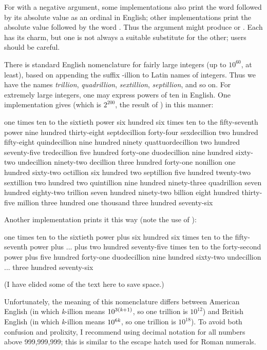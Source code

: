 \begin{flushdesc}
\begin{new}
For  with a negative argument, some implementations also print
the word  followed by its absolute value as an ordinal in English;
other implementations print the absolute value followed by the word .
Thus the argument  might produce  or .
Each has its charm, but one is not always a suitable substitute for the other;
users should be careful.

There is standard English nomenclature for fairly large integers (up to $10^60$,
at least), based on appending the suffix -illion to Latin names of integers.
Thus we have the names \emph{trillion}, \emph{quadrillion}, \emph{sextillion},
\emph{septillion}, and so on.  For extremely large integers, one may express powers
of ten in English.
One implementation gives
(which is $2^{200}$, the result of )
in this manner:
\begin{flushleft}
\small \cf
one times ten to the sixtieth power six hundred six times ten to the
fifty-seventh power nine hundred thirty-eight septdecillion forty-four
sexdecillion two hundred fifty-eight quindecillion nine hundred ninety
quattuordecillion two hundred seventy-five tredecillion five hundred forty-one
duodecillion nine hundred sixty-two undecillion ninety-two decillion three
hundred forty-one nonillion one hundred sixty-two octillion six hundred two
septillion five hundred twenty-two sextillion two hundred two quintillion nine
hundred ninety-three quadrillion seven hundred eighty-two trillion seven hundred
ninety-two billion eight hundred thirty-five million three hundred one thousand
three hundred seventy-six
\end{flushleft}
Another implementation prints it this way (note the use of ):
\begin{flushleft}
\small \cf
one times ten to the sixtieth power plus six hundred six times ten to the fifty-seventh power plus
... plus two hundred seventy-five times ten to the
forty-second power plus five hundred forty-one duodecillion nine hundred sixty-two undecillion
...  three hundred seventy-six
\end{flushleft}
(I have elided some of the text here to save space.)

Unfortunately, the meaning of this nomenclature differs between American English (in which {\it
k}-illion means $10^{3(\hbox{\scriptsize\it k}+1)}$, so one trillion is $10^{12}$) and British English (in which {\it
k}-illion means $10^{6\hbox{\scriptsize\it k}}$, so one trillion is $10^{18}$).
To avoid both confusion and prolixity, 
I recommend using decimal notation for all numbers above 999,999,999;
this is similar to the escape hatch used for Roman numerals.
\end{new}


\end{flushdesc}
